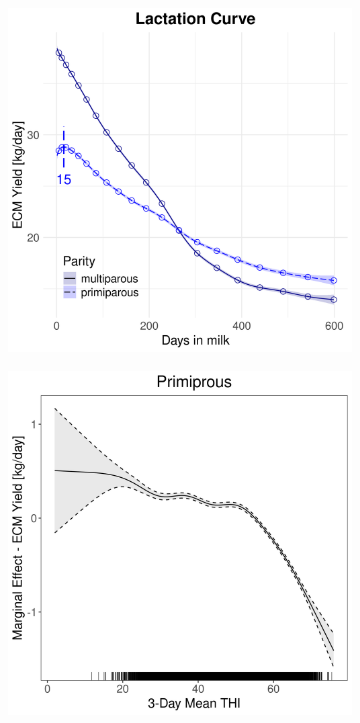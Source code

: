 \begin{figure}[H]
\begin{subfigure}[b]{0.45\textwidth}
        \includegraphics[width=\textwidth]{thesis/figures/models/ecm/before2010/ho_ecm_before2010/ho_ecm_before2010_marginal_dim_milk_combined.png}
    \end{subfigure}
    \begin{subfigure}[b]{0.45\textwidth}
        \centering
        \includegraphics[width=\textwidth]{thesis/figures/models/ecm/before2010/ho_ecm_before2010/ho_ecm_before2010_marginal_thi_milk_primi.png}

\end{subfigure}
\end{figure}
